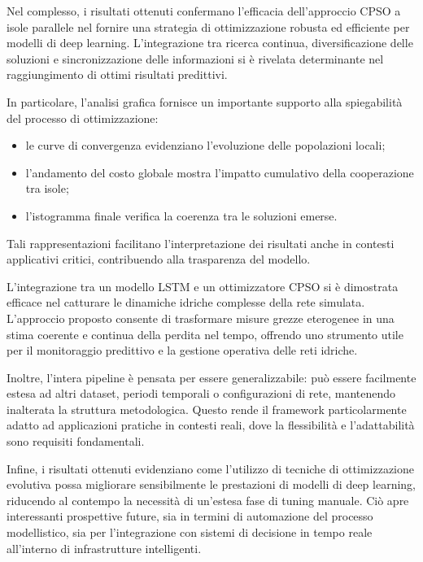 \documentclass{article}
\begin{document}
Nel complesso, i risultati ottenuti confermano l’efficacia dell’approccio CPSO a isole parallele nel fornire una 
strategia di ottimizzazione robusta ed efficiente per modelli di deep learning. L’integrazione tra ricerca continua, 
diversificazione delle soluzioni e sincronizzazione delle informazioni si è rivelata determinante nel raggiungimento 
di ottimi risultati predittivi.

In particolare, l’analisi grafica fornisce un importante supporto alla spiegabilità del processo di ottimizzazione: 
\begin{itemize}
    \item le curve di convergenza evidenziano l’evoluzione delle popolazioni locali;
    \item l’andamento del costo globale mostra l’impatto cumulativo della cooperazione tra isole;
    \item l’istogramma finale verifica la coerenza tra le soluzioni emerse.
\end{itemize}
Tali rappresentazioni facilitano l’interpretazione dei risultati anche in contesti applicativi critici, 
contribuendo alla trasparenza del modello.

L’integrazione tra un modello LSTM e un ottimizzatore CPSO si è dimostrata efficace nel catturare le 
dinamiche idriche complesse della rete simulata. L’approccio proposto consente di trasformare misure 
grezze eterogenee in una stima coerente e continua della perdita nel tempo, offrendo uno strumento utile 
per il monitoraggio predittivo e la gestione operativa delle reti idriche.

Inoltre, l’intera pipeline è pensata per essere generalizzabile: può essere facilmente estesa ad altri 
dataset, periodi temporali o configurazioni di rete, mantenendo inalterata la struttura metodologica. 
Questo rende il framework particolarmente adatto ad applicazioni pratiche in contesti reali, dove la 
flessibilità e l’adattabilità sono requisiti fondamentali.

Infine, i risultati ottenuti evidenziano come l’utilizzo di tecniche di ottimizzazione evolutiva possa 
migliorare sensibilmente le prestazioni di modelli di deep learning, riducendo al contempo la necessità 
di un’estesa fase di tuning manuale. Ciò apre interessanti prospettive future, sia in termini di 
automazione del processo modellistico, sia per l’integrazione con sistemi di decisione in tempo reale 
all’interno di infrastrutture intelligenti.



\end{document}

